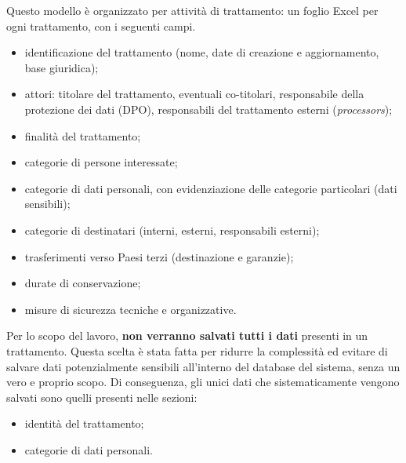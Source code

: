 Questo modello è organizzato per attività di trattamento: un foglio Excel per ogni trattamento, con i seguenti campi.
\begin{itemize}
	\item identificazione del trattamento (nome, date di creazione e aggiornamento, base giuridica);
	\item attori: titolare del trattamento, eventuali co-titolari, responsabile della protezione dei dati (DPO), responsabili del trattamento esterni (\textit{processors});
	\item finalità del trattamento;
	\item categorie di persone interessate;
	\item categorie di dati personali, con evidenziazione delle categorie particolari (dati sensibili);
	\item categorie di destinatari (interni, esterni, responsabili esterni);
	\item trasferimenti verso Paesi terzi (destinazione e garanzie);
	\item durate di conservazione;
	\item misure di sicurezza tecniche e organizzative.
\end{itemize}

Per lo scopo del lavoro, \textbf{non verranno salvati tutti i dati} presenti in un trattamento. Questa scelta è stata fatta per ridurre la complessità ed evitare di salvare dati potenzialmente sensibili all'interno del database del sistema, senza un vero e proprio scopo. Di conseguenza, gli unici dati che sistematicamente vengono salvati sono quelli presenti nelle sezioni:
\begin{itemize}
	\item identità del trattamento;
	\item categorie di dati personali.
\end{itemize}

